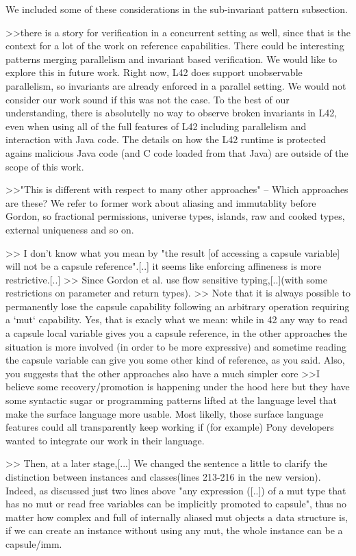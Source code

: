 We included some of these considerations in the sub-invariant pattern subsection.


>>there is a story for verification in a concurrent setting as well, since that is  the context for a lot of the work on reference capabilities.
There could be interesting patterns merging parallelism and invariant based verification. We would like to explore this in future work.
Right now, L42 does support unobservable parallelism, so invariants are already enforced in a parallel setting.
We would not consider our work sound if this was not the case. To the best of our understanding, there is absolutelly no way to observe broken invariants in L42, even when using all of the full features of L42 including parallelism and interaction with Java code.
The details on how the L42 runtime is protected agains malicious Java code (and C code loaded from that Java) are outside of the scope of this work.

>>"This is different with respect to many other approaches"  -- Which approaches are these? 
We refer to former work about aliasing and immutablity before Gordon, so fractional permissions, universe types, islands, raw and cooked types, external uniqueness and so on.


>> I don't know what you mean by "the result [of accessing a capsule variable] will not be a capsule reference".[..] it seems like enforcing affineness is more restrictive.[..]
>>  Since Gordon et al. use flow sensitive typing,[..](with some restrictions on parameter and return types).
>>  Note that it is always possible to permanently lose the capsule  capability following an arbitrary operation requiring a `mut` capability.
Yes, that is exacly what we mean: while in 42 any way to read a capsule local variable gives you a capsule reference, in the other approaches the situation is more involved
 (in order to be more expressive) and sometime reading the capsule variable can give you some other kind of reference, as you said.
Also, you suggests that the other approaches also have a much simpler core 
>>I believe some recovery/promotion is happening under the hood here
but they have some syntactic sugar or programming patterns lifted at the language level that make the surface language more usable.
Most likelly, those surface language features could all transparently keep working if (for example) Pony developers wanted to integrate our work in their language.


>> Then, at a later stage,[...]
We changed the sentence a little to clarify the distinction between instances and classes(lines 213-216 in the new version). Indeed, as discussed just two lines above
"any expression ([..]) of a mut type that has no mut or read free variables can be implicitly promoted to capsule",
thus no matter how complex and full of internally aliased mut objects a data structure is, if we can create an instance without using any mut, the whole instance can be a capsule/imm.


